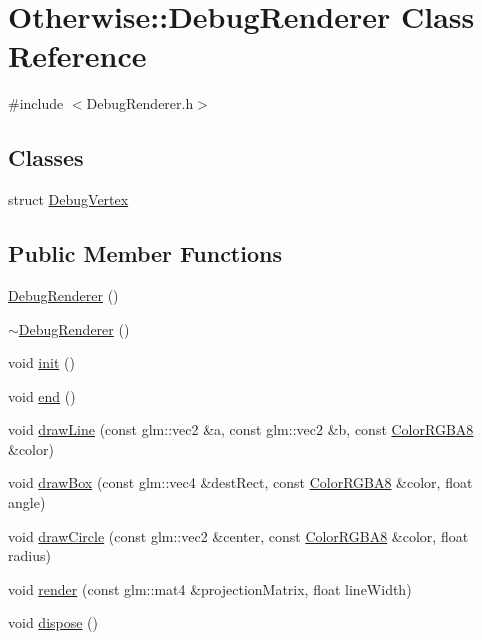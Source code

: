 \hypertarget{class_otherwise_1_1_debug_renderer}{}\section{Otherwise\+:\+:Debug\+Renderer Class Reference}
\label{class_otherwise_1_1_debug_renderer}


{\ttfamily \#include $<$Debug\+Renderer.\+h$>$}

\subsection*{Classes}
\begin{DoxyCompactItemize}
\item 
struct \hyperlink{struct_otherwise_1_1_debug_renderer_1_1_debug_vertex}{Debug\+Vertex}
\end{DoxyCompactItemize}
\subsection*{Public Member Functions}
\begin{DoxyCompactItemize}
\item 
\hyperlink{class_otherwise_1_1_debug_renderer_a1a7b2b1eea49c096e5c94c9333e3c5f2}{Debug\+Renderer} ()
\item 
\hyperlink{class_otherwise_1_1_debug_renderer_ada40b5979baece9c0d245b25066d961c}{$\sim$\+Debug\+Renderer} ()
\item 
void \hyperlink{class_otherwise_1_1_debug_renderer_a3577bb4d2ae74deabf818d7e9392a38f}{init} ()
\item 
void \hyperlink{class_otherwise_1_1_debug_renderer_afbd9d155a5fb89e6254f11d918f37eef}{end} ()
\item 
void \hyperlink{class_otherwise_1_1_debug_renderer_a6d42ed7172dcbc216b7891de6b4de487}{draw\+Line} (const glm\+::vec2 \&a, const glm\+::vec2 \&b, const \hyperlink{struct_otherwise_1_1_color_r_g_b_a8}{Color\+R\+G\+B\+A8} \&color)
\item 
void \hyperlink{class_otherwise_1_1_debug_renderer_adbc966ac0b9c1c76091e50369f378ef3}{draw\+Box} (const glm\+::vec4 \&dest\+Rect, const \hyperlink{struct_otherwise_1_1_color_r_g_b_a8}{Color\+R\+G\+B\+A8} \&color, float angle)
\item 
void \hyperlink{class_otherwise_1_1_debug_renderer_afc8de4f52bece8d40e3e114a1cf1caab}{draw\+Circle} (const glm\+::vec2 \&center, const \hyperlink{struct_otherwise_1_1_color_r_g_b_a8}{Color\+R\+G\+B\+A8} \&color, float radius)
\item 
void \hyperlink{class_otherwise_1_1_debug_renderer_a585f385bd19bc29dcff51f9e7dd6b046}{render} (const glm\+::mat4 \&projection\+Matrix, float line\+Width)
\item 
void \hyperlink{class_otherwise_1_1_debug_renderer_a5dc3e918a2073bafbd30e184c7195f09}{dispose} ()
\end{DoxyCompactItemize}
